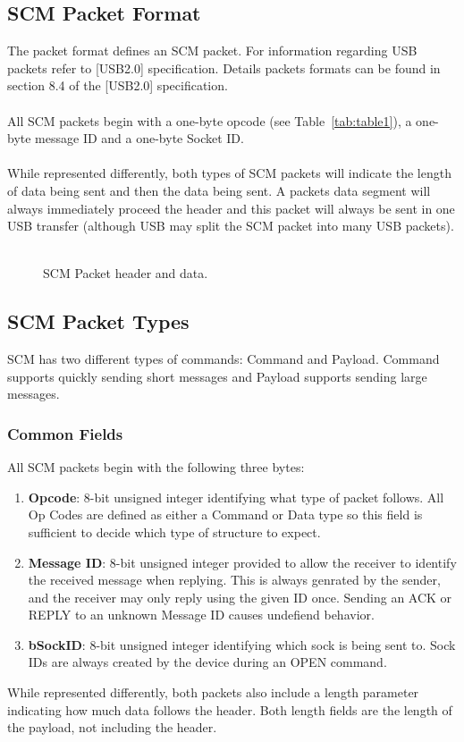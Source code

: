 \documentclass[10pt]{article}
\begin{document}
	\subsection{SCM Packet Format}
	The packet format defines an SCM packet. For information regarding USB packets refer to [USB2.0] specification. Details packets formats can be found in section 8.4 of the [USB2.0] specification. \\
	\\
	All SCM packets begin with a one-byte opcode (see Table~\ref{tab:table1}), a one-byte message ID and a one-byte Socket ID. \\
	\\
	While represented differently, both types of SCM packets will indicate the length of data being sent and then the data being sent. A packets data segment will always immediately proceed the header and this packet will always be sent in one USB transfer (although USB may split the SCM packet into many USB packets). \\
	\\
	\begin{figure}[H]
		\caption[SCM Packet header and data.]{SCM Packet header and data.}
			\centerline {
		} 
	\end{figure}
	\subsection{SCM Packet Types}
	SCM has two different types of commands: Command and Payload. Command supports quickly sending short messages and Payload supports sending large messages.
	\subsubsection{Common Fields}
	All SCM packets begin with the following three bytes:\\
	\begin{enumerate}
		\item \textbf{Opcode}: 8-bit unsigned integer identifying what type of packet follows. All Op Codes are defined as either a Command or Data type so this field is sufficient to decide which type of structure to expect.
		\item \textbf{Message ID}: 8-bit unsigned integer provided to allow the receiver to identify the received message when replying. This is always genrated by the sender, and the receiver may only reply using the given ID once. Sending an ACK or REPLY to an unknown Message ID causes undefiend behavior.
		\item \textbf{bSockID}: 8-bit unsigned integer identifying which sock is being sent to. Sock IDs are always created by the device during an OPEN command.
	\end{enumerate}
	While represented differently, both packets also include a length parameter indicating how much data follows the header. Both length fields are the length of the payload, not including the header. 
	
\end{document}
